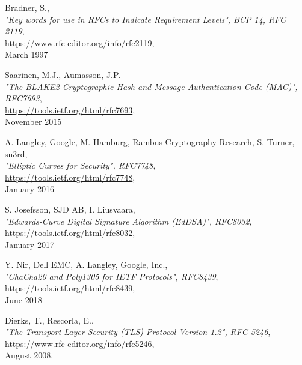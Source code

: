 \documentclass[10pt]{article}
\begin{document}
\renewcommand{\refname}{\section{References}} %
\begin{thebibliography}{XXXXXXX}


  Bradner, S.,\\
  \emph{"Key words for use in RFCs to Indicate Requirement Levels", BCP 14, RFC 2119},\\
  \url{https://www.rfc-editor.org/info/rfc2119},\\
  March 1997

  Saarinen, M.J., Aumasson, J.P.\\
  \emph{"The BLAKE2 Cryptographic Hash and Message Authentication Code (MAC)", RFC7693},\\
  \url{https://tools.ietf.org/html/rfc7693},\\
  November 2015

  A. Langley, Google, M. Hamburg, Rambus Cryptography Research, S. Turner, sn3rd,\\
  \emph{"Elliptic Curves for Security", RFC7748},\\
  \url{https://tools.ietf.org/html/rfc7748},\\
  January 2016

  S. Josefsson, SJD AB, I. Liusvaara,\\
  \emph{"Edwards-Curve Digital Signature Algorithm (EdDSA)", RFC8032},\\
  \url{https://tools.ietf.org/html/rfc8032},\\
  January 2017

  Y. Nir, Dell EMC, A. Langley, Google, Inc.,\\
  \emph{"ChaCha20 and Poly1305 for IETF Protocols", RFC8439},\\
  \url{https://tools.ietf.org/html/rfc8439},\\
  June 2018


  Dierks, T., Rescorla, E.,\\
  \emph{"The Transport Layer Security (TLS) Protocol Version 1.2", RFC 5246},\\
  \url{https://www.rfc-editor.org/info/rfc5246},\\
  August 2008.

\end{thebibliography}
\end{document}
